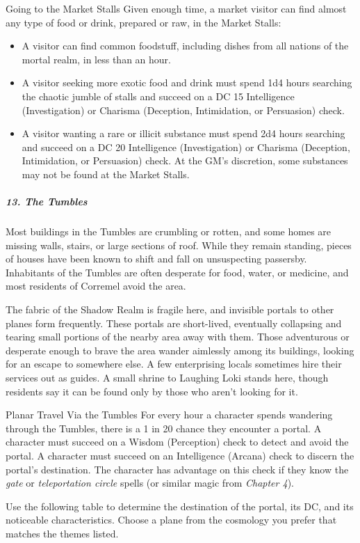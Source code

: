 \documentclass[10pt,a4paper,twoside,bg=print,twocolumn,openany,nodeprecatedcode]{dndbook}
\begin{document}
\begin{DndSidebar}[float=!b]{Going to the Market Stalls}
Given enough time, a market visitor can find almost any type of food or drink, prepared or raw, in the Market Stalls:




\begin{itemize}
\item A visitor can find common foodstuff, including dishes from all nations of the mortal realm, in less than an hour.
\item A visitor seeking more exotic food and drink must spend 1d4 hours searching the chaotic jumble of stalls and succeed on a DC 15 Intelligence (Investigation) or Charisma (Deception, Intimidation, or Persuasion) check.
\item A visitor wanting a rare or illicit substance must spend 2d4 hours searching and succeed on a DC 20 Intelligence (Investigation) or Charisma (Deception, Intimidation, or Persuasion) check. At the GM's discretion, some substances may not be found at the Market Stalls.
\end{itemize}



\end{DndSidebar}

\subparagraph{13. The Tumbles}
Most buildings in the Tumbles are crumbling or rotten, and some homes are missing walls, stairs, or large sections of roof. While they remain standing, pieces of houses have been known to shift and fall on unsuspecting passersby. Inhabitants of the Tumbles are often desperate for food, water, or medicine, and most residents of Corremel avoid the area.

The fabric of the Shadow Realm is fragile here, and invisible portals to other planes form frequently. These portals are short-lived, eventually collapsing and tearing small portions of the nearby area away with them. Those adventurous or desperate enough to brave the area wander aimlessly among its buildings, looking for an escape to somewhere else. A few enterprising locals sometimes hire their services out as guides. A small shrine to Laughing Loki stands here, though residents say it can be found only by those who aren't looking for it.

\begin{DndSidebar}[float=!b]{Planar Travel Via the Tumbles}
For every hour a character spends wandering through the Tumbles, there is a 1 in 20 chance they encounter a portal. A character must succeed on a Wisdom (Perception) check to detect and avoid the portal. A character must succeed on an Intelligence (Arcana) check to discern the portal's destination. The character has advantage on this check if they know the \textit{gate} or \textit{teleportation circle} spells (or similar magic from \textit{Chapter 4}).



Use the following table to determine the destination of the portal, its DC, and its noticeable characteristics. Choose a plane from the cosmology you prefer that matches the themes listed.



\end{DndSidebar}
\end{document}
